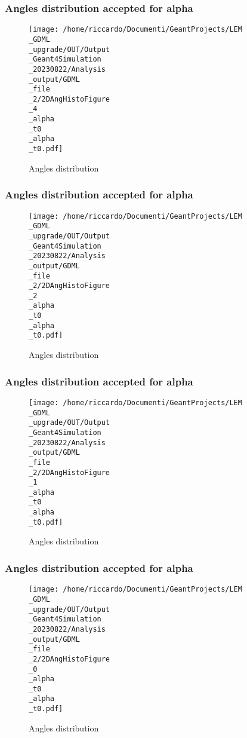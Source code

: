 \documentclass[8pt]{beamer}
\begin{document}
            \begin{frame}
                \frametitle{Angles distribution accepted for alpha}
            
        \begin{figure}[h]
            \centering
            \texttt{[image: /home/riccardo/Documenti/GeantProjects/LEM\\\_GDML\\\_upgrade/OUT/Output\\\_Geant4Simulation\\\_20230822/Analysis\\\_output/GDML\\\_file\\\_2/2DAngHistoFigure\\\_4\\\_alpha\\\_t0\\\_alpha\\\_t0.pdf]}
            \caption{Angles distribution}
        \end{figure}
        
            \end{frame}
            
            \begin{frame}
                \frametitle{Angles distribution accepted for alpha}
            
        \begin{figure}[h]
            \centering
            \texttt{[image: /home/riccardo/Documenti/GeantProjects/LEM\\\_GDML\\\_upgrade/OUT/Output\\\_Geant4Simulation\\\_20230822/Analysis\\\_output/GDML\\\_file\\\_2/2DAngHistoFigure\\\_2\\\_alpha\\\_t0\\\_alpha\\\_t0.pdf]}
            \caption{Angles distribution}
        \end{figure}
        
            \end{frame}
            
            \begin{frame}
                \frametitle{Angles distribution accepted for alpha}
            
        \begin{figure}[h]
            \centering
            \texttt{[image: /home/riccardo/Documenti/GeantProjects/LEM\\\_GDML\\\_upgrade/OUT/Output\\\_Geant4Simulation\\\_20230822/Analysis\\\_output/GDML\\\_file\\\_2/2DAngHistoFigure\\\_1\\\_alpha\\\_t0\\\_alpha\\\_t0.pdf]}
            \caption{Angles distribution}
        \end{figure}
        
            \end{frame}
            
            \begin{frame}
                \frametitle{Angles distribution accepted for alpha}
            
        \begin{figure}[h]
            \centering
            \texttt{[image: /home/riccardo/Documenti/GeantProjects/LEM\\\_GDML\\\_upgrade/OUT/Output\\\_Geant4Simulation\\\_20230822/Analysis\\\_output/GDML\\\_file\\\_2/2DAngHistoFigure\\\_0\\\_alpha\\\_t0\\\_alpha\\\_t0.pdf]}
            \caption{Angles distribution}
        \end{figure}
        
            \end{frame}
            
\end{document}
